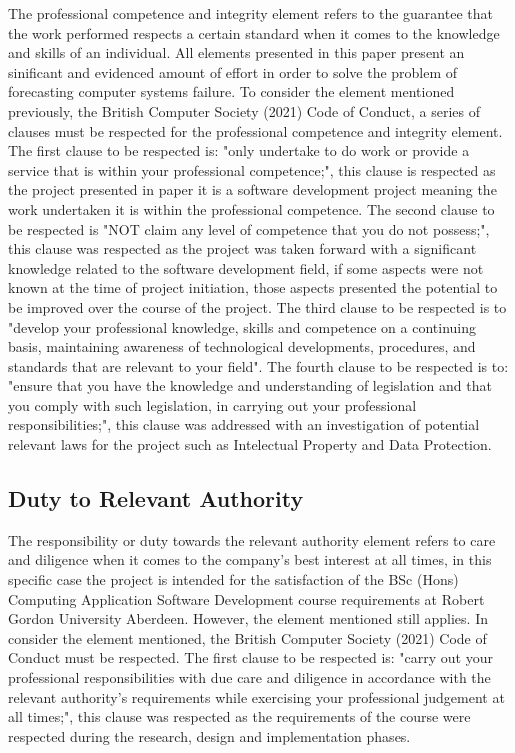The professional competence and integrity element refers to the guarantee that the work
performed respects a certain standard when it comes to the knowledge and skills of an
individual. All elements presented in this paper present an sinificant and evidenced
amount of effort in order to solve the problem of forecasting computer systems failure.
To consider the element mentioned previously, the British Computer Society (2021)
Code of Conduct, a series of clauses must be respected for the professional competence
and integrity element. The first clause to be respected is: "only undertake to do work
or provide a service that is within your professional competence;", this clause is
respected as the project presented in paper it is a software development project
meaning the work undertaken it is within the professional competence. The second
clause to be respected is "NOT claim any level of competence that you do not possess;",
this clause was respected as the project was taken forward with a significant
knowledge related to the software development field, if some aspects were not known at the
time of project initiation, those aspects presented the potential to be improved over the
course of the project. The third clause to be respected is to "develop your professional
knowledge, skills and competence on a continuing basis, maintaining awareness of
technological developments, procedures, and standards that are relevant to your field".
The fourth clause to be respected is to: "ensure that you have the knowledge and
understanding of legislation and that you comply with such legislation, in carrying
out your professional responsibilities;", this clause was addressed with an investigation
of potential relevant laws for the project such as Intelectual Property and
Data Protection.

\subsection{Duty to Relevant Authority}

The responsibility or duty towards the relevant authority element refers to care and
diligence when it comes to the company's best interest at all times, in this specific
case the project is intended for the satisfaction of the BSc (Hons) Computing Application
Software Development course requirements at Robert Gordon University Aberdeen. However,
the element mentioned still applies. In consider the element mentioned, the British Computer
Society (2021) Code of Conduct must be respected. The first clause to be respected is:
"carry out your professional responsibilities with due care and diligence in accordance
with the relevant authority’s requirements while exercising your professional judgement
at all times;", this clause was respected as the requirements of the course
were respected during the research, design and implementation phases.

